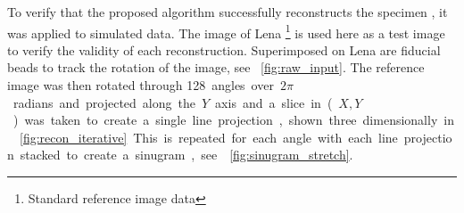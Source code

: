 To verify that the proposed algorithm successfully reconstructs the specimen%
, it was applied to simulated data.
The image of Lena
\footnote{Standard reference image data
}
is used here as a test image to verify the validity of each reconstruction.
Superimposed on Lena are fiducial beads to track the rotation of the image, see \figurename~\ref{fig:raw_input}.
The reference image was then rotated through \SI{128} angles over \(2\pi\) radians and projected along the \(Y\) axis and a slice in (\(X,Y\)) was taken to create a single line projection, shown three dimensionally in \figurename~\ref{fig:recon_iterative}.
This is repeated for each angle with each line projection stacked to create a sinugram, see \figurename~\ref{fig:sinugram_stretch}.


